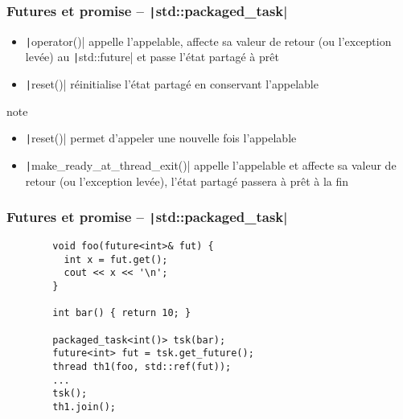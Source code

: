\documentclass[C++.tex]{subfiles}
\begin{document}
\begin{frame}[fragile]
	\frametitle{Futures et promise -- \texttt|std::packaged_task|}
	\begin{itemize}
		\item \texttt|operator()| appelle l'appelable, affecte sa valeur de retour (ou l'exception levée) au \texttt|std::future| et passe l'état partagé à prêt
		\item \texttt|reset()| réinitialise l'état partagé en conservant l'appelable
	\end{itemize}

	\begin{block}{note}
		\begin{itemize}
			\item \texttt|reset()| permet d'appeler une nouvelle fois l'appelable
		\end{itemize}
	\end{block}

	\begin{itemize}
		\item \texttt|make_ready_at_thread_exit()| appelle l'appelable et affecte sa valeur de retour (ou l'exception levée), l'état partagé passera à prêt à la fin
	\end{itemize}
\end{frame}

\begin{frame}[fragile]
	\frametitle{Futures et promise -- \texttt|std::packaged_task|}
	\begin{verbatim}
		void foo(future<int>& fut) {
		  int x = fut.get();
		  cout << x << '\n';
		}

		int bar() { return 10; }

		packaged_task<int()> tsk(bar);
		future<int> fut = tsk.get_future();
		thread th1(foo, std::ref(fut));
		...
		tsk();
		th1.join();
	\end{verbatim}
\end{frame}
\end{document}
